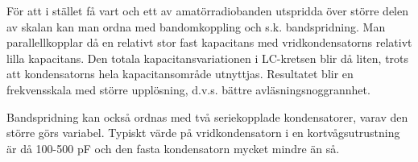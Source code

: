För att i stället få vart och ett av amatörradiobanden utspridda över
större delen av skalan kan man ordna med bandomkoppling och
s.k. bandspridning. Man parallellkopplar då en relativt stor fast
kapacitans med vridkondensatorns relativt lilla kapacitans. Den totala
kapacitansvariationen i LC-kretsen blir då liten, trots att
kondensatorns hela kapacitansområde utnyttjas. Resultatet blir en
frekvensskala med större upplösning, d.v.s. bättre
avläsningsnoggrannhet.

Bandspridning kan också ordnas med två seriekopplade kondensatorer,
varav den större görs variabel. Typiskt värde på vridkondensatorn i en
kortvågsutrustning är då 100-500 pF och den fasta kondensatorn mycket
mindre än så.
